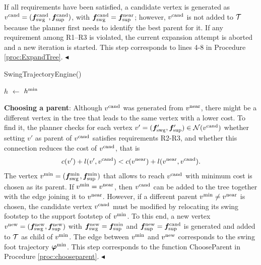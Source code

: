 If all requirements have been satisfied, a candidate vertex is generated as
$v^{\rm cand} = ({\bm{f}}_{\rm swg}^{\rm cand}, {\bm{f}}_{\rm sup}^{\rm cand})$, with
${\bm{f}}_{\rm swg}^{\rm cand} = {\bm{f}}_{\rm sup}^{\rm near}$; however, $v^{\rm cand}$
is not added to $\cal T$ because the planner first needs to identify the best
parent for it. If any requirement among R1--R3 is violated, the current
expansion attempt is aborted and a new iteration is started.
This step corresponds to lines 4-8 in Procedure \ref{proc:ExpandTree}.
\hfill $\blacktriangleleft$

\begin{procedure}%
	\small
	\removelatexerror
	
	\caption{SwingTrajectoryEngine()}
	\label{proc:genswgtraj}

    \BlankLine

	$h$ $\leftarrow$ $h^{\rm min}$\;
	
			
	\Return{$\emptyset$}\;	
\end{procedure}

{\bf Choosing a parent}: Although $v^{\rm cand}$ was generated from
$v^{\rm near}$, there might be a different vertex in the tree that leads to
the same vertex with a lower cost. To find it, the planner checks for each
vertex $v' = ({\bm{f}}'_{\rm swg}, {\bm{f}}'_{\rm sup})\in {\cal N} (v^{\rm cand})$
whether setting $v'$ as parent of $v^{\rm cand}$ satisfies requirements R2-R3,
and whether this connection reduces the cost of $v^{\rm cand}$, that is 
\[
c(v') + l(v', v^{\rm cand}) < c(v^{\rm near}) + l(v^{\rm near}, v^{\rm cand}).
\]
The vertex $v^{\rm min} = ({\bm{f}}_{\rm swg}^{\rm min}, {\bm{f}}_{\rm sup}^{\rm min})$
that allows to reach $v^{\rm cand}$ with minimum cost is chosen as its parent.
If $v^{\rm min} = v^{\rm near}$, then $v^{\rm cand}$ can be added to the tree
together with the edge joining it to $v^{\rm near}$. However, if a different
parent $v^{\rm min} \neq v^{\rm near}$ is chosen, the candidate vertex
$v^{\rm cand}$ must be modified by relocating its swing footstep to the support
footstep of $v^{\rm min}$. To this end, a new vertex
$v^{\rm new} = ({\bm{f}}_{\rm swg}^{\rm new}, {\bm{f}}_{\rm sup}^{\rm new})$ with
${\bm{f}}_{\rm swg}^{\rm new} = {\bm{f}}_{\rm sup}^{\rm min}$ and
${\bm{f}}_{\rm sup}^{\rm new} = {\bm{f}}_{\rm sup}^{\rm cand}$ is generated and added
to ${\cal T}$ as child of $v^{\rm min}$. The edge between $v^{\rm min}$ and
$v^{\rm new}$ corresponds to the swing foot trajectory ${\bm{\varphi}}^{\rm min}$. 
This step corresponds to the function ChooseParent in Procedure
\ref{proc:chooseparent}.
\hfill $\blacktriangleleft$

